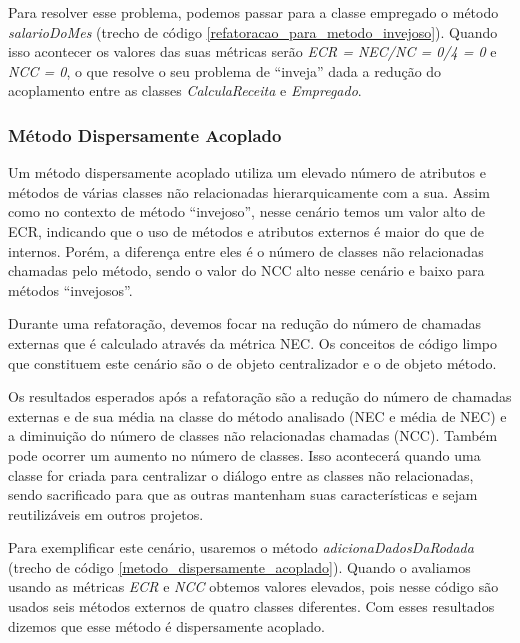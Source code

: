 Para resolver esse problema, podemos passar para a classe empregado o método \textit{salarioDoMes} (trecho de código \ref{refatoracao_para_metodo_invejoso}). Quando isso acontecer os valores das suas métricas serão \textit{ECR = NEC/NC = 0/4 = 0} e \textit{NCC = 0}, o que resolve o seu problema de ``inveja'' dada a redução do acoplamento entre as classes \textit{CalculaReceita} e \textit{Empregado}. 




\subsubsection{Método Dispersamente Acoplado}
	
Um método dispersamente acoplado utiliza um elevado número de atributos e métodos de várias classes não relacionadas hierarquicamente com a sua. Assim como no contexto de método ``invejoso'', nesse cenário temos um valor alto de ECR, indicando que o uso de métodos e atributos externos é maior do que de internos. Porém, a diferença entre eles é o número de classes não relacionadas chamadas pelo método, sendo o valor do NCC alto nesse cenário e baixo para métodos ``invejosos''.
	
Durante uma refatoração, devemos focar na redução do número de chamadas externas que é calculado através da métrica NEC. Os conceitos de código limpo que constituem este cenário são o de objeto centralizador e o de objeto método.
	
Os resultados esperados após a refatoração são a redução do número de chamadas externas e de sua média na classe do método analisado (NEC e média de NEC) e a diminuição do número de classes não relacionadas chamadas (NCC). Também pode ocorrer um aumento no número de classes. Isso acontecerá quando uma classe for criada para centralizar o diálogo entre as classes não relacionadas, sendo sacrificado para que as outras mantenham suas características e sejam reutilizáveis em outros projetos. 
	  
Para exemplificar este cenário, usaremos o método \textit{adicionaDadosDaRodada} (trecho de código \ref{metodo_dispersamente_acoplado}). Quando o avaliamos usando as métricas \textit{ECR} e \textit{NCC} obtemos valores elevados, pois nesse código são usados seis métodos externos de quatro classes diferentes. Com esses resultados dizemos que esse método é dispersamente acoplado.
  
